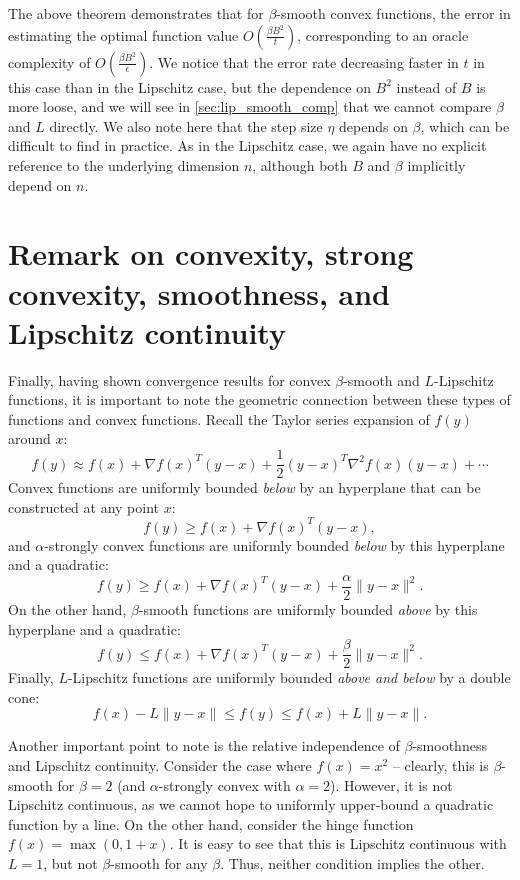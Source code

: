 The above theorem demonstrates that for $\beta$-smooth convex functions, the error in estimating the optimal function value $O\left(\frac{\beta B^2}{t}\right)$, corresponding to an oracle complexity of $O\left(\frac{\beta B^2}{\epsilon}\right)$. We notice that the error rate decreasing faster in $t$ in this case than in the Lipschitz case, but the dependence on $B^2$ instead of $B$ is more loose, and we will see in \autoref{sec:lip_smooth_comp} that we cannot compare $\beta$ and $L$ directly. We also note here that the step size $\eta$ depends on $\beta$, which can be difficult to find in practice. As in the Lipschitz case, we again have no explicit reference to the underlying dimension $n$, although both $B$ and $\beta$ implicitly depend on $n$.

\section{Remark on convexity, strong convexity, smoothness, and Lipschitz continuity} \label{sec:lip_smooth_comp}
Finally, having shown convergence results for convex $\beta$-smooth and $L$-Lipschitz functions, it is important to note the geometric connection between these types of functions and convex functions. Recall the Taylor series expansion of $f(y)$ around $x$:
\[
f(y) \approx f(x) + \nabla f(x)^T (y - x) + \frac{1}{2} (y - x)^T \nabla^2 f(x) (y - x) + \cdots
\]
Convex functions are uniformly bounded \emph{below} by an hyperplane that can be constructed at any point $x$:
\[
f(y) \geq f(x) + \nabla f(x)^T (y - x),
\]
and $\alpha$-strongly convex functions are uniformly bounded \emph{below} by this hyperplane and a quadratic:
\[
f(y) \geq f(x) + \nabla f(x)^T (y - x) + \frac{\alpha}{2} \| y - x \|^2.
\]
On the other hand, $\beta$-smooth functions are uniformly bounded \emph{above} by this hyperplane and a quadratic:
\[
f(y) \leq f(x) + \nabla f(x)^T (y - x) + \frac{\beta}{2} \| y - x \|^2.
\]
Finally, $L$-Lipschitz functions are uniformly bounded \emph{above and below} by a double cone:
\[
f(x) - L \| y - x \| \le f(y) \leq f(x) + L \| y - x \|.
\]

Another important point to note is the relative independence of $\beta$-smoothness and Lipschitz continuity. Consider the case where $f(x) = x^2$ -- clearly, this is $\beta$-smooth for $\beta = 2$ (and $\alpha$-strongly convex with $\alpha=2$). However, it is not Lipschitz continuous, as we cannot hope to uniformly upper-bound a quadratic function by a line. On the other hand, consider the hinge function $f(x) = \max(0, 1 + x)$. It is easy to see that this is Lipschitz continuous with $L = 1$, but not $\beta$-smooth for any $\beta$. Thus, neither condition implies the other.


